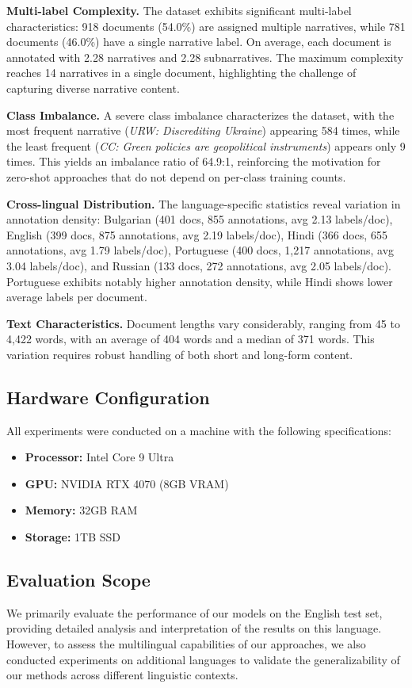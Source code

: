 \textbf{Multi-label Complexity.} The dataset exhibits significant multi-label characteristics: 918 documents (54.0\%) are assigned multiple narratives, while 781 documents (46.0\%) have a single narrative label. On average, each document is annotated with 2.28 narratives and 2.28 subnarratives. The maximum complexity reaches 14 narratives in a single document, highlighting the challenge of capturing diverse narrative content.

\textbf{Class Imbalance.} A severe class imbalance characterizes the dataset, with the most frequent narrative (\textit{URW: Discrediting Ukraine}) appearing 584 times, while the least frequent (\textit{CC: Green policies are geopolitical instruments}) appears only 9 times. This yields an imbalance ratio of 64.9:1, reinforcing the motivation for zero-shot approaches that do not depend on per-class training counts.

\textbf{Cross-lingual Distribution.} The language-specific statistics reveal variation in annotation density: Bulgarian (401 docs, 855 annotations, avg 2.13 labels/doc), English (399 docs, 875 annotations, avg 2.19 labels/doc), Hindi (366 docs, 655 annotations, avg 1.79 labels/doc), Portuguese (400 docs, 1,217 annotations, avg 3.04 labels/doc), and Russian (133 docs, 272 annotations, avg 2.05 labels/doc). Portuguese exhibits notably higher annotation density, while Hindi shows lower average labels per document.

\textbf{Text Characteristics.} Document lengths vary considerably, ranging from 45 to 4,422 words, with an average of 404 words and a median of 371 words. This variation requires robust handling of both short and long-form content.

\subsection{Hardware Configuration}

All experiments were conducted on a machine with the following specifications:
\begin{itemize}
\item \textbf{Processor:} Intel Core 9 Ultra
\item \textbf{GPU:} NVIDIA RTX 4070 (8GB VRAM)
\item \textbf{Memory:} 32GB RAM
\item \textbf{Storage:} 1TB SSD
\end{itemize}

\subsection{Evaluation Scope}

We primarily evaluate the performance of our models on the English test set, providing detailed analysis and interpretation of the results on this language. However, to assess the multilingual capabilities of our approaches, we also conducted experiments on additional languages to validate the generalizability of our methods across different linguistic contexts.